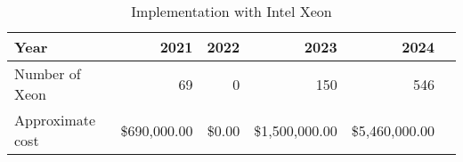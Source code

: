 \tiny \begin{longtable} { |p{}  |r  |r  |r  |r  |r |} 
\caption{Implementation with Intel Xeon \label{tab:Xeon}}\\ 
\hline 
\textbf{Year}&\textbf{2021}&\textbf{2022}&\textbf{2023}&\textbf{2024} \\ \hline
{Number of Xeon}&{69}&{0}&{150}&{546} \\ \hline
{Approximate cost}&{\$690,000.00}&{\$0.00}&{\$1,500,000.00}&{\$5,460,000.00} \\ \hline
\end{longtable} \normalsize
